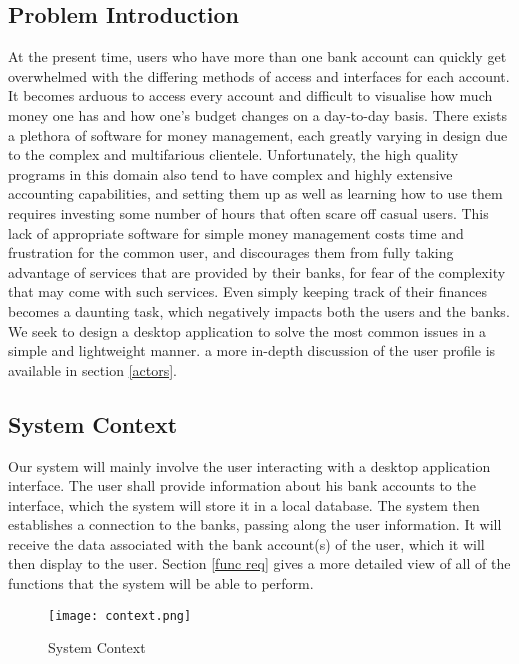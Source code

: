 \documentclass[11pt]{article}
\newcounter{use case ID}
\newcounter{req ID}
\begin{document}
\subsection{Problem Introduction}
At the present time, users who have more than one bank account can quickly get overwhelmed with the differing methods of access and interfaces for each account. It becomes arduous to access every account and difficult to visualise how much money one has and how one's budget changes on a day-to-day basis. There exists a plethora of software for money management, each greatly varying in design due to the complex and multifarious clientele. Unfortunately, the high quality programs in this domain also tend to have complex and highly extensive accounting capabilities, and setting them up as well as learning how to use them requires investing some number of hours that often scare off casual users. This lack of appropriate software for simple money management costs time and frustration for the common user, and discourages them from fully taking advantage of services that are provided by their banks, for fear of the complexity that may come with such services. Even simply keeping track of their finances becomes a daunting task, which negatively impacts both the users and the banks. We seek to design a desktop application to solve the most common issues in a simple and lightweight manner. a more in-depth discussion of the user profile is available in section \ref{actors}.

\subsection{System Context}

Our system will mainly involve the user interacting with a desktop application interface. The user shall provide information about his bank accounts to the interface, which the system will store it in a local database. The system then establishes a connection to the banks, passing along the user information. It will receive the data associated with the bank account(s) of the user, which it will then display to the user. Section \ref{func req} gives a more detailed view of all of the functions that the system will be able to perform.

\clearpage

\begin{figure}[htbp]
    \texttt{[image: context.png]}
    \caption{System Context}
    \label{fig:system-context}
\end{figure}
\end{document}
